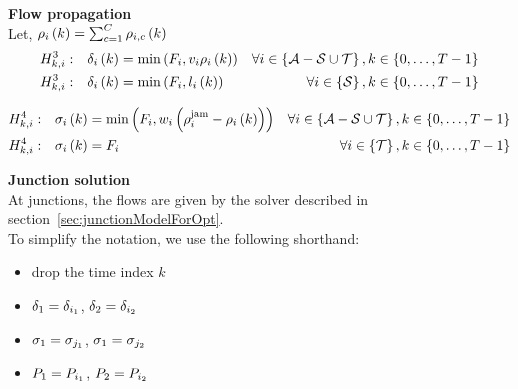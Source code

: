 \noindent \textbf{Flow propagation}\\

\noindent Let, $\rho_{i}\left(k\right) = \sum_{c=1}^{C}\rho_{i,c}\left(k\right)$
\begin{subequations}
\begin{align}
H^{3}_{k, i}: && \delta_{i}\left(k\right) & =\min\left(F_{i},v_{i}\rho_{i}\left(k\right)\right) & \forall i\in\left\{{\cal A} - {\cal S} \cup {\cal T} \right\} ,k\in\left\{ 0,\ldots,T-1\right\}
\label{eq:junctionDemand} 
\\
H^{3}_{k, i}: && \delta_{i}\left(k\right) & =\min\left(F_{i},l_{i}\left(k\right)\right) & \forall i\in\left\{{\cal S}\right\} ,k\in\left\{ 0,\ldots,T-1\right\}
\label{eq:junctionDemandSource}
\end{align}
\end{subequations}

\begin{subequations}
\begin{align}
H^{4}_{k, i}: && \sigma_{i}\left(k\right) & =\min\left(F_{i},w_{i}\left(\rho^{\text{jam}}_{i}-\rho_{i}\left(k\right)\right)\right) & \forall i\in\left\{{\cal A} - {\cal S} \cup {\cal T} \right\} ,k\in\left\{ 0,\ldots,T-1\right\} 
\label{eq:junctionSupply}  
\\
H^{4}_{k, i}: && \sigma_{i}\left(k\right) & =F_{i} & \forall i\in\left\{{\cal T} \right\} ,k\in\left\{ 0,\ldots,T-1\right\} 
\label{eq:junctionSupplySink}  
\end{align}
\end{subequations}

\noindent \textbf{Junction solution}\\

\noindent At junctions, the flows are given by the solver described in section~\ref{sec:junctionModelForOpt}. \\

To simplify the notation, we use the following shorthand:
\begin{itemize}
\item drop the time index $k$
\item $\delta_{1} = \delta_{i_1}$,
$\delta_{2} = \delta_{i_2}$
\item $\sigma_{1} = \sigma_{j_1}$, 
$\sigma_{1} = \sigma_{j_2}$
\item $P_{1} = P_{i_1}$, 
$P_{2} = P_{i_2}$
\end{itemize}

